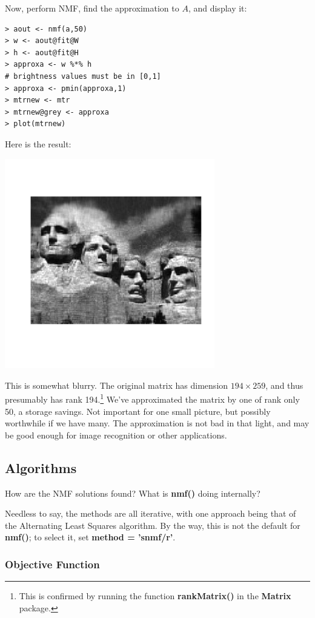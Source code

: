 Now, perform NMF, find the approximation to $A$, and display it:

\begin{lstlisting}
> aout <- nmf(a,50)
> w <- aout@fit@W
> h <- aout@fit@H
> approxa <- w %*% h
# brightness values must be in [0,1]
> approxa <- pmin(approxa,1) 
> mtrnew <- mtr
> mtrnew@grey <- approxa 
> plot(mtrnew) 
\end{lstlisting}

Here is the result:

\includegraphics[width=3.6in]{Images/MtRush50.png}

This is somewhat blurry.  The original matrix has dimension $194
\times 259$, and thus presumably has rank 194.\footnote{This is
confirmed by running the function {\bf rankMatrix()} in the {\bf Matrix}
package.} We've approximated the matrix by one of rank only 50, a
storage savings.  Not important for one small picture, but possibly
worthwhile if we have many. The approximation is not bad in that light,
and may be good enough for image recognition or other applications.

\subsection{Algorithms}

How are the NMF solutions found?  What is {\bf nmf()} doing internally?

Needless to say, the methods are all iterative, with one approach being
that of the Alternating Least Squares algorithm.  By the way, this is
not the default for {\bf nmf()}; to select it, set {\bf method =
'snmf/r'}.

\subsubsection{Objective Function}


